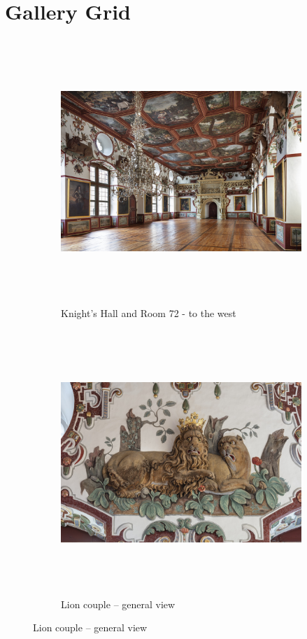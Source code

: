 \documentclass[
  a4paper,
]{book}
\begin{document}

\chapter{Gallery Grid}\label{gallery-grid}

\begin{figure}

\begin{figure}[H]    
  \includegraphics[height=10cm]{images/fmd10005862a.jpg}
  \caption{Knight's Hall and Room 72 - to the west}
  \label{fig:{images/fmd10005862a.jpg}}
\end{figure}

\clearpage

\begin{figure}[H]    
  \includegraphics[height=10cm]{images/fmd10005864a.jpg}
  \caption{Lion couple – general view}
  \label{fig:{images/fmd10005864a.jpg}}
\end{figure}


\end{figure}
\end{document}
